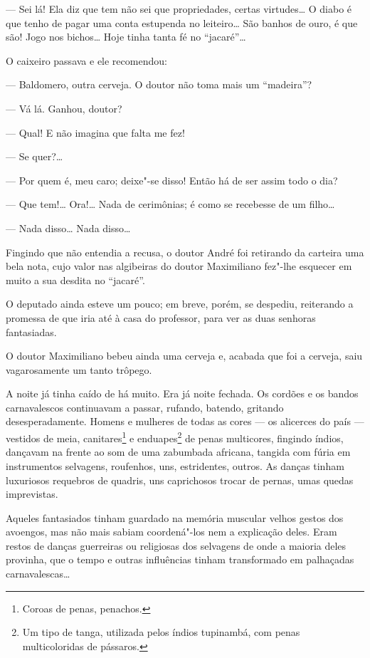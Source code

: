 --- Sei lá! Ela diz que tem não sei que propriedades, certas virtudes\ldots{}
O diabo é que tenho de pagar uma conta estupenda no leiteiro\ldots{} São
banhos de ouro, é que são! Jogo nos bichos\ldots{} Hoje tinha tanta fé no
``jacaré''\ldots{}

O caixeiro passava e ele recomendou:

--- Baldomero, outra cerveja. O doutor não toma mais um ``madeira''?

--- Vá lá. Ganhou, doutor?

--- Qual! E não imagina que falta me fez!

--- Se quer?\ldots{}

--- Por quem é, meu caro; deixe"-se disso! Então há de ser assim todo o
dia?

--- Que tem!\ldots{} Ora!\ldots{} Nada de cerimônias; é como se recebesse de um
filho\ldots{}

--- Nada disso\ldots{} Nada disso\ldots{}

Fingindo que não entendia a recusa, o doutor André foi retirando da
carteira uma bela nota, cujo valor nas algibeiras do doutor Maximiliano
fez"-lhe esquecer em muito a sua desdita no ``jacaré''.

O deputado ainda esteve um pouco; em breve, porém, se despediu,
reiterando a promessa de que iria até à casa do professor, para ver as
duas senhoras fantasiadas.

O doutor Maximiliano bebeu ainda uma cerveja e, acabada que foi a
cerveja, saiu vagarosamente um tanto trôpego.

A noite já tinha caído de há muito. Era já noite fechada. Os cordões e
os bandos carnavalescos continuavam a passar, rufando, batendo, gritando
desesperadamente. Homens e mulheres de todas as cores --- os alicerces do
país --- vestidos de meia, canitares\footnote{Coroas de penas, penachos.}
e enduapes\footnote{Um tipo de tanga, utilizada pelos índios tupinambá,
  com penas multicoloridas de pássaros.} de penas multicores, fingindo
índios, dançavam na frente ao som de uma zabumbada africana, tangida com
fúria em instrumentos selvagens, roufenhos, uns, estridentes, outros. As
danças tinham luxuriosos requebros de quadris, uns caprichosos trocar de
pernas, umas quedas imprevistas.

Aqueles fantasiados tinham guardado na memória muscular velhos gestos
dos avoengos, mas não mais sabiam coordená"-los nem a explicação deles.
Eram restos de danças guerreiras ou religiosas dos selvagens de onde a
maioria deles provinha, que o tempo e outras influências tinham
transformado em palhaçadas carnavalescas\ldots{}

